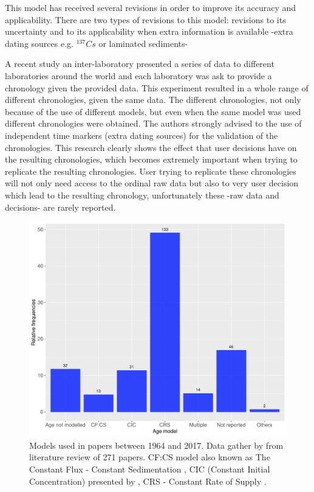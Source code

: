 \documentclass [10pt] {article}
\begin{document}
This model has received several revisions  in order to improve its accuracy and applicability. 
There are two types of revisions to this model: revisions to its uncertainty \citep{Binford1990,Sanchez-Cabeza2014} and to its applicability when extra information is available -extra dating sources e.g. $^{137}Cs$ or laminated sediments- \citep{Appleby1998,Appleby2001,Appleby2008}

A recent study \citep{Barsanti2020} an inter-laboratory presented a series of data to different laboratories around the world and each laboratory was ask to provide a chronology given the provided data.
This experiment resulted in a whole range of different chronologies, given the same data. 
The different chronologies, not only because of the use of different models, but even when the same model was used different chronologies were obtained.
The authors strongly advised to the use of independent time markers (extra dating sources) for the validation of the chronologies.
This research clearly shows the effect that user decisions have on the resulting chronologies, which becomes extremely important when trying to replicate the resulting chronologies.
User trying to replicate these chronologies will not only need access to the ordinal raw data but also to very user decision which lead to the resulting chronology, unfortunately these -raw data and decisions- are rarely reported.


\begin{figure}[h!]
	\begin{centering}
		\includegraphics[width=.75\linewidth]{210Pbmodels-bar.pdf}
		\caption{Models used in papers between 1964 and 2017. Data gather by \citet{Courtney2019} from literature review of 271 papers. CF:CS model also known as The Constant Flux - Constant Sedimentation \citep{Robbins1978}, CIC (Constant Initial Concentration) presented by \citet{Goldberg1963,Crozaz1964,Robbins1978}, CRS - Constant Rate of Supply \citep{Appleby1978,Robbins1978}. }
		\label{fig:210models}
	\end{centering}
\end{figure}
\end{document}
